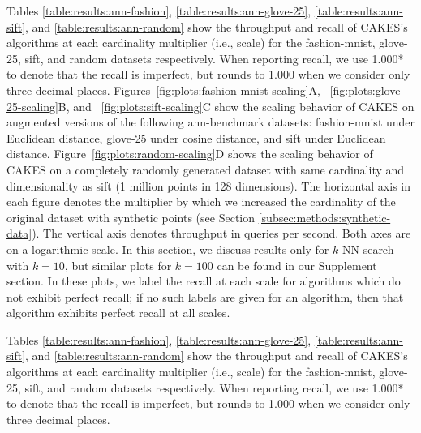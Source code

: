 Tables \ref{table:results:ann-fashion}, \ref{table:results:ann-glove-25}, \ref{table:results:ann-sift}, and \ref{table:results:ann-random} show the throughput and recall of CAKES's algorithms at each cardinality multiplier (i.e., scale) for the fashion-mnist, glove-25, sift, and random datasets respectively. When reporting recall, we use 1.000* to denote that the recall is imperfect, but rounds to 1.000 when we consider
only three decimal places.
Figures~\ref{fig:plots:fashion-mnist-scaling}A, ~\ref{fig:plots:glove-25-scaling}B, and ~\ref{fig:plots:sift-scaling}C show the scaling behavior of CAKES on augmented versions of the following ann-benchmark datasets: fashion-mnist under Euclidean distance, glove-25 under cosine distance, and sift under Euclidean distance. 
Figure~\ref{fig:plots:random-scaling}D shows the scaling behavior of CAKES on a completely randomly generated dataset with same cardinality and dimensionality as sift (1 million points in 128 dimensions).
The horizontal axis in each figure denotes the multiplier by which we increased the cardinality of the original dataset with synthetic points (see Section \ref{subsec:methods:synthetic-data}). 
The vertical axis denotes throughput in queries per second. Both axes are on a logarithmic scale. In this section, we discuss results only for $k$-NN search with $k = 10$, but similar plots for $k=100$ can be found in our Supplement section. In these plots, we label the recall at each scale for algorithms which do not exhibit perfect recall; if no such labels are given for an algorithm, then that algorithm exhibits perfect recall at all scales.

Tables \ref{table:results:ann-fashion}, \ref{table:results:ann-glove-25}, \ref{table:results:ann-sift}, and \ref{table:results:ann-random} show the throughput and recall of CAKES's algorithms at each cardinality multiplier (i.e., scale) for the fashion-mnist, glove-25, sift, and random datasets respectively. When reporting recall, we use 1.000* to denote that the recall is imperfect, but rounds to 1.000 when we consider
only three decimal places.

